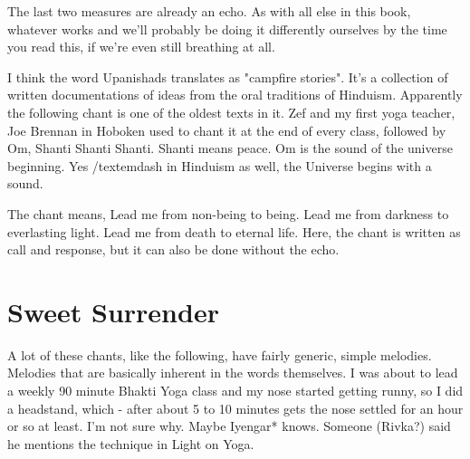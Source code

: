 \documentclass[a5paper,twoside,9pt]{extbook}
\newtheorem{I Surrender}{Definition}
\begin{document}
The last two measures are already an echo. As with all else in this book, whatever works and we'll probably be doing it differently ourselves by the time you read this, if we're even still breathing at all.

\begin{quote}
{%
\parindent 0pt
\noindent
\ifx\preLilyPondExample \undefined
\else
  \expandafter\preLilyPondExample
\fi
\def\lilypondbook{}%

\ifx\postLilyPondExample \undefined
\else
  \expandafter\postLilyPondExample
\fi
}
\end{quote}

I think the word Upanishads translates as "campfire stories". It's a collection of written documentations of ideas from the oral traditions of Hinduism. Apparently the following chant is one of the oldest texts in it. Zef and my first yoga teacher, Joe Brennan in Hoboken used to chant it at the end of every class, followed by Om, Shanti Shanti Shanti. Shanti means peace. Om is the sound of the universe beginning. Yes /textemdash in Hinduism as well, the Universe begins with a sound.

The chant means, Lead me from non-being to being. Lead me from darkness to everlasting light. Lead me from death to eternal life. Here, the chant is written as call and response, but it can also be done without the echo.

\begin{quote}
{%
\parindent 0pt
\noindent
\ifx\preLilyPondExample \undefined
\else
  \expandafter\preLilyPondExample
\fi
\def\lilypondbook{}%

\ifx\postLilyPondExample \undefined
\else
  \expandafter\postLilyPondExample
\fi
}
\end{quote}


\chapter{Sweet Surrender}

A lot of these chants, like the following, have fairly generic, simple melodies. Melodies that are basically inherent in the words themselves. I was about to lead a weekly 90 minute Bhakti Yoga class and my nose started getting runny, so I did a headstand, which - after about 5 to 10 minutes gets the nose settled for an hour or so at least. I'm not sure why. Maybe Iyengar* knows. Someone (Rivka?) said he mentions the technique in Light on Yoga. 
\end{document}
